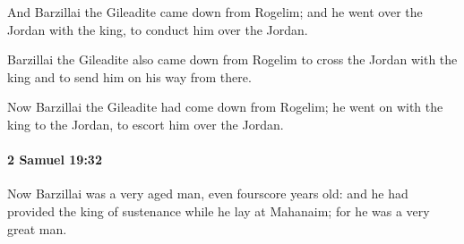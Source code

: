 			\begin{versebox}
					\item[BHS] 
					\item[ASV] And Barzillai the Gileadite came down from Rogelim; and he went over the Jordan with the king, to conduct him over the Jordan.
					\item[NIV] Barzillai the Gileadite also came down from Rogelim to cross the Jordan with the king and to send him on his way from there.
					\item[NRSV] Now Barzillai the Gileadite had come down from Rogelim; he went on with the king to the Jordan, to escort him over the Jordan.
			\end{versebox}

		\paragraph{2 Samuel 19:32} %
			\label{2SAMUEL-19-32}

			Now Barzillai was a very aged man, even fourscore years old: and he had provided the king of sustenance while he lay at Mahanaim; for he was a very great man.

